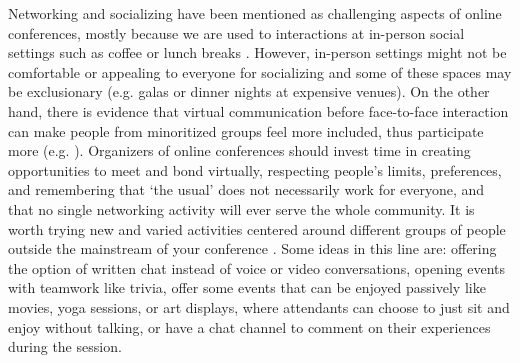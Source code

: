 \documentclass[10pt,letterpaper]{article}
\begin{document}
Networking and socializing have been mentioned as challenging aspects of online conferences, mostly because we are used to interactions at in-person social settings such as coffee or lunch breaks \cite{salibaGettingGripsOnline2020, roosOnlineConferencesNew2020}. 
However, in-person settings might not be comfortable or appealing to everyone for socializing and 
some of these spaces may be exclusionary (e.g. galas or dinner nights at expensive venues). 
On the other hand, there is evidence that virtual communication before face-to-face interaction can make people from minoritized groups feel more included, thus participate more (e.g. \cite{trianaDoesOrderFacetoFace2012, blackEngenderingBelongingThoughtful2020}). 
Organizers of online conferences should invest time in creating opportunities to meet and bond virtually, respecting people's limits, preferences, and remembering that `the usual' does not necessarily work for everyone, and that no single networking activity will ever serve the whole community. 
It is worth trying new and varied activities centered around different groups of people outside the mainstream of your conference %
.
Some ideas in this line are: offering the option of written chat instead of voice or video conversations, opening events with teamwork like trivia, offer some events that can be enjoyed passively like movies, yoga sessions, or art displays, where attendants can choose to just sit and enjoy without talking, or have a chat channel to comment on their experiences during the session. 


\end{document}

